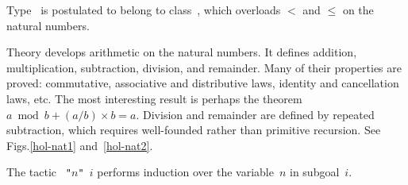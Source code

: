 Type~ is postulated to belong to class~, which
overloads $<$ and $\leq$ on the natural numbers.

Theory  develops arithmetic on the natural numbers.  It
defines addition, multiplication, subtraction, division, and remainder.
Many of their properties are proved: commutative, associative and
distributive laws, identity and cancellation laws, etc.  The most
interesting result is perhaps the theorem $a \bmod b + (a/b)\times b = a$.
Division and remainder are defined by repeated subtraction, which requires
well-founded rather than primitive recursion.  See Figs.\ts\ref{hol-nat1}
and~\ref{hol-nat2}.


The tactic {\tt{} "$n$" $i$} performs induction over the
variable~$n$ in subgoal~$i$.

